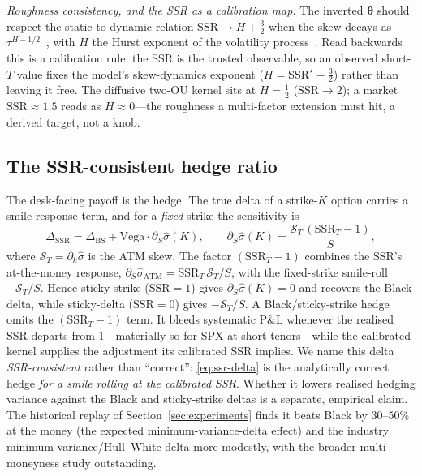 \documentclass[11pt]{article}
\newcommand{\BS}{\operatorname{BS}}
\newcommand{\SSR}{\mathrm{SSR}}
\newcommand{\bth}{{\boldsymbol{\theta}}}
\begin{document}
\emph{Roughness consistency, and the SSR as a calibration map.} The inverted $\bth$ should
respect the static-to-dynamic relation $\SSR\to H+\tfrac32$ when the skew decays as
$\tau^{H-1/2}$~\cite{doeffkamal2012}, with $H$ the Hurst exponent of the volatility
process~\cite{frizgatheral2024,fukasawa2026}. Read backwards this is a calibration
rule: the SSR is the trusted observable, so an observed short-$T$ value fixes the model's
skew-dynamics exponent ($H=\SSR^\star-\tfrac32$) rather than leaving it free. The diffusive
two-OU kernel sits at $H=\tfrac12$ ($\SSR\to2$); a market $\SSR\approx 1.5$ reads as
$H\approx 0$---the roughness a multi-factor extension must hit, a derived target, not a knob.

\subsection{The SSR-consistent hedge ratio}
The desk-facing payoff is the hedge. The true delta of a strike-$K$ option carries a
smile-response term, and for a \emph{fixed} strike the sensitivity is
\begin{equation}
\Delta_{\SSR}=\Delta_{\BS}+\mathrm{Vega}\cdot\partial_S\widehat\sigma(K),\qquad
\partial_S\widehat\sigma(K)=\frac{\mathcal S_T\,(\SSR_T-1)}{S},
\label{eq:ssr-delta}
\end{equation}
where $\mathcal S_T=\partial_k\widehat\sigma$ is the ATM skew. The factor $(\SSR_T-1)$
combines the SSR's at-the-money response,
$\partial_S\widehat\sigma_{\mathrm{ATM}}=\SSR_T\,\mathcal S_T/S$, with the fixed-strike
smile-roll $-\mathcal S_T/S$. Hence sticky-strike ($\SSR=1$) gives
$\partial_S\widehat\sigma(K)=0$ and recovers the Black delta, while sticky-delta
($\SSR=0$) gives $-\mathcal S_T/S$. A Black/sticky-strike hedge omits the $(\SSR_T-1)$
term. It bleeds systematic P\&L whenever the realised SSR departs from $1$---materially so
for SPX at short tenors---while the calibrated kernel supplies the adjustment its
calibrated SSR implies. We name this delta \emph{SSR-consistent} rather than
``correct'': \eqref{eq:ssr-delta} is the analytically correct hedge \emph{for a smile
rolling at the calibrated SSR}. Whether it lowers realised hedging variance against the
Black and sticky-strike deltas is a separate, empirical claim. The historical replay of
Section~\ref{sec:experiments} finds it beats Black by $30$--$50\%$ at the money (the expected
minimum-variance-delta effect) and the industry minimum-variance/Hull--White delta more modestly,
with the broader multi-moneyness study outstanding.
\end{document}
